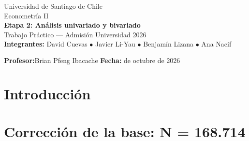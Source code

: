 \documentclass[11pt]{article}
\newif\ifborrador
\newcommand{\redactar}[1]{\ifborrador
  \begin{tcolorbox}[colback=red!4,colframe=red!60!black,fonttitle=\bfseries\small,
    title=Redactar (lo escribe el grupo),breakable,left=4pt,right=4pt,top=1pt,bottom=1pt]
  \small #1\end{tcolorbox}\fi}
\newcommand{\cod}[1]{\texttt{\detokenize{#1}}}
\begin{document}
\sloppy

\begin{titlepage}
\centering
\vspace*{3cm}
{\large Universidad de Santiago de Chile}\\[6pt]
{\large Econometría II}\\[2cm]
{\LARGE \textbf{Etapa 2: Análisis univariado y bivariado}}\\[10pt]
{\large Trabajo Práctico --- Admisión Universidad 2026}\\[3cm]

\textbf{Integrantes:}\quad
David Cuevas $\bullet$ Javier Li-Yau $\bullet$ Benjamín Lizana $\bullet$ Ana Nacif

\vspace{0.6cm}

\textbf{Profesor:}\quad Brian Pfeng Ibacache
\qquad
\textbf{Fecha:} de octubre de 2026
\end{titlepage}

\section{Introducción}

\redactar{3--5 líneas. Qué se hizo en la Etapa 1 (base y variable de respuesta), qué se corrige ahora (el N, ver §2) y qué busca esta etapa: medir la relación de cada X candidata con $I$ (univariado y bivariado con WOE e IV) para llegar a las X definitivas del logit de la Etapa 3.}

\section{Corrección de la base: N = 168.714}

\redactar{Explicar por qué cambia la base. Antes: \cod{full_join} de los cuatro archivos y N = 108.251. Ahora la base maestra es el archivo de rendición (Archivo C), filtrado; las postulaciones (Archivo D) solo dejan una marca, \cod{flag_postula}, y la matrícula (vía 1, tipo 1) se pega con \cod{left_join}. Decir por qué se excluye a quienes ya rindieron antes (evitar sesgo: el profesor lo comparó con excluir a los funcionarios en banca) y por qué los que rindieron y no postularon quedan como $I = 0$.}
\end{document}

